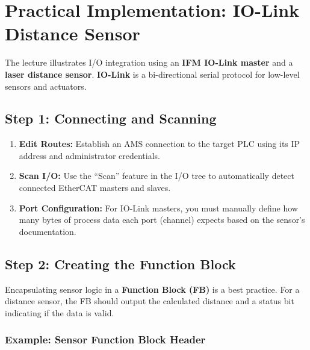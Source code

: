 \documentclass[11pt,a4paper]{article}
\begin{document}
\section{Practical Implementation: IO-Link Distance Sensor}

The lecture illustrates I/O integration using an \textbf{IFM IO-Link master} and a \textbf{laser distance sensor}. \textbf{IO-Link} is a bi-directional serial protocol for low-level sensors and actuators.

\subsection{Step 1: Connecting and Scanning}

\begin{enumerate}
    \item \textbf{Edit Routes:} Establish an AMS connection to the target PLC using its IP address and administrator credentials.
    \item \textbf{Scan I/O:} Use the ``Scan'' feature in the I/O tree to automatically detect connected EtherCAT masters and slaves.
    \item \textbf{Port Configuration:} For IO-Link masters, you must manually define how many bytes of process data each port (channel) expects based on the sensor's documentation.
\end{enumerate}

\subsection{Step 2: Creating the Function Block}

Encapsulating sensor logic in a \textbf{Function Block (FB)} is a best practice. For a distance sensor, the FB should output the calculated distance and a status bit indicating if the data is valid.

\subsubsection*{Example: Sensor Function Block Header}
\end{document}
